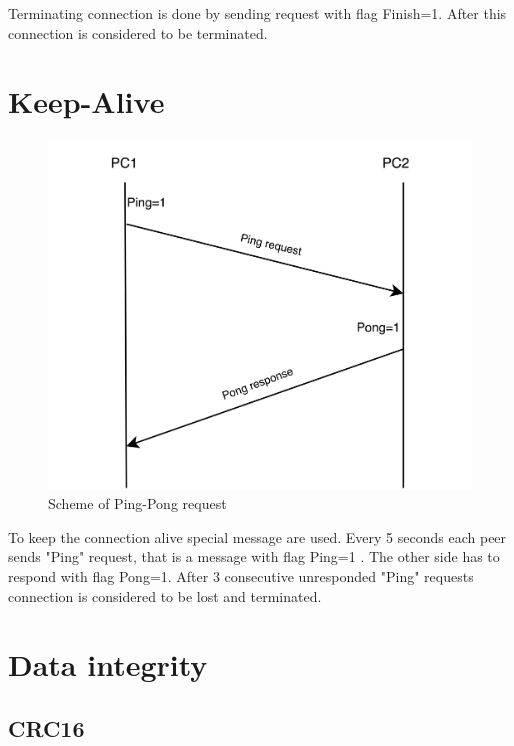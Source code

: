 \documentclass{article}
\begin{document}
Terminating connection is done by sending request with flag Finish=1. After this connection is considered to be terminated.


\section{Keep-Alive}

\begin{figure}[h]
    \centering
    \includegraphics[width=\textwidth]{images/pingpong.png}
    \caption{Scheme of Ping-Pong request}
    \label{fig:mesh1}
\end{figure}
To keep the connection alive special message are used. Every 5 seconds each peer sends "Ping" request, that is a message with flag Ping=1 . The other side has to respond with flag Pong=1. After 3 consecutive unresponded "Ping" requests connection is considered to be lost and terminated.



\section{Data integrity}


\subsection{CRC16}
\end{document}
